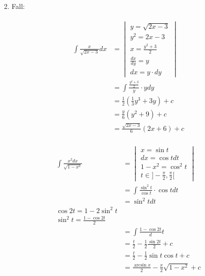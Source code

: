 2. Fall: \\
\begin{bsp*}
	\begin{gather*}
		\begin{split}
			\int \frac{x}{\sqrt{2x-3}} dx	&= \begin{vmatrix}
										y = \sqrt{2x-3} \\
										y^2 = 2x-3 \\
										x = \frac{y^2+3}{2} \\
										\frac{dx}{dy} = y \\
										dx = y \cdot dy
									\end{vmatrix} \\
								&= \int \frac{\frac{y^2+3}{2}}{y} \cdot y dy \\
								&= \frac{1}{2} \left( \frac{1}{3} y^3 + 3y \right) + c \\
								&= \frac{y}{6} (y^2+9) + c \\
								&= \frac{\sqrt{2x-3}}{6} (2x+6) + c
		\end{split}
	\end{gather*}
\end{bsp*}
\begin{bsp*}
	\begin{gather*}
		\begin{split}
			\int \frac{x^2 dx}{\sqrt{1-x^2}}	&= \begin{vmatrix}
											x = \sin t \\
											dx = \cos t dt \\
											1 - x^2 = \cos^2 t \\
											t \in ] -\frac{\pi}{2} , \frac{\pi}{2} [
										\end{vmatrix} \\
									&= \int \frac{\sin^2 t}{\cos t} \cdot \cos t dt \\
									&= \sin^2 t dt \\
			\cos 2t = 1 - 2\sin^2 t \\
			\sin^2 t = \frac{1 - \cos 2t}{2} \\
									&= \int \frac{1 - \cos 2t} dt \\
									&= \frac{t}{2} - \frac{1}{2} \frac{\sin 2t}{2} + c \\
									&= \frac{t}{2} - \frac{1}{2} \sin t \cos t + c \\
									&= \frac{\arcsin x}{2} - \frac{x}{2} \sqrt{1-x^2} + c
		\end{split}
	\end{gather*}
\end{bsp*}
